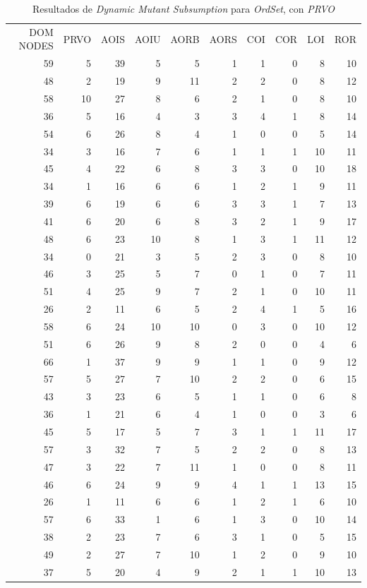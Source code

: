 \begin{table}[]
	\caption[\emph{Dynamic Mutant Subsumption} \emph{OrdSet}, con \emph{PRVO}]{Resultados de \emph{Dynamic Mutant Subsumption} para \emph{OrdSet}, con \emph{PRVO}}
	\label{tables.results.subsumption.ordset.prvo}
	\centering
	\scriptsize
	\def\arraystretch{0.95}
	\setlength\tabcolsep{0.5mm}
	\begin{tabular}{rrrrrrrrrr}
		DOM NODES & PRVO & AOIS & AOIU & AORB & AORS & COI & COR & LOI & ROR \\
		59 & 5 & 39 & 5 & 5 & 1 & 1 & 0 & 8 & 10 \\
		48 & 2 & 19 & 9 & 11 & 2 & 2 & 0 & 8 & 12 \\
		58 & 10 & 27 & 8 & 6 & 2 & 1 & 0 & 8 & 10 \\
		36 & 5 & 16 & 4 & 3 & 3 & 4 & 1 & 8 & 14 \\
		54 & 6 & 26 & 8 & 4 & 1 & 0 & 0 & 5 & 14 \\
		34 & 3 & 16 & 7 & 6 & 1 & 1 & 1 & 10 & 11 \\
		45 & 4 & 22 & 6 & 8 & 3 & 3 & 0 & 10 & 18 \\
		34 & 1 & 16 & 6 & 6 & 1 & 2 & 1 & 9 & 11 \\
		39 & 6 & 19 & 6 & 6 & 3 & 3 & 1 & 7 & 13 \\
		41 & 6 & 20 & 6 & 8 & 3 & 2 & 1 & 9 & 17 \\
		48 & 6 & 23 & 10 & 8 & 1 & 3 & 1 & 11 & 12 \\
		34 & 0 & 21 & 3 & 5 & 2 & 3 & 0 & 8 & 10 \\
		46 & 3 & 25 & 5 & 7 & 0 & 1 & 0 & 7 & 11 \\
		51 & 4 & 25 & 9 & 7 & 2 & 1 & 0 & 10 & 11 \\
		26 & 2 & 11 & 6 & 5 & 2 & 4 & 1 & 5 & 16 \\
		58 & 6 & 24 & 10 & 10 & 0 & 3 & 0 & 10 & 12 \\
		51 & 6 & 26 & 9 & 8 & 2 & 0 & 0 & 4 & 6 \\
		66 & 1 & 37 & 9 & 9 & 1 & 1 & 0 & 9 & 12 \\
		57 & 5 & 27 & 7 & 10 & 2 & 2 & 0 & 6 & 15 \\
		43 & 3 & 23 & 6 & 5 & 1 & 1 & 0 & 6 & 8 \\
		36 & 1 & 21 & 6 & 4 & 1 & 0 & 0 & 3 & 6 \\
		45 & 5 & 17 & 5 & 7 & 3 & 1 & 1 & 11 & 17 \\
		57 & 3 & 32 & 7 & 5 & 2 & 2 & 0 & 8 & 13 \\
		47 & 3 & 22 & 7 & 11 & 1 & 0 & 0 & 8 & 11 \\
		46 & 6 & 24 & 9 & 9 & 4 & 1 & 1 & 13 & 15 \\
		26 & 1 & 11 & 6 & 6 & 1 & 2 & 1 & 6 & 10 \\
		57 & 6 & 33 & 1 & 6 & 1 & 3 & 0 & 10 & 14 \\
		38 & 2 & 23 & 7 & 6 & 3 & 1 & 0 & 5 & 15 \\
		49 & 2 & 27 & 7 & 10 & 1 & 2 & 0 & 9 & 10 \\
		37 & 5 & 20 & 4 & 9 & 2 & 1 & 1 & 10 & 13
	\end{tabular}
\end{table}